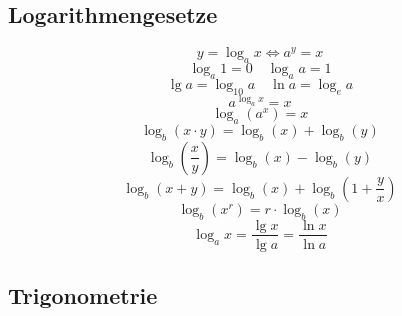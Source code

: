 \subsection{Logarithmengesetze}
\[ \boxed{y=\log_ax \Leftrightarrow a^y=x} \]
\[ \boxed{\log_a1=0 \quad \log_aa=1} \]
\[ \boxed{\lg a=\log_{10}a \quad \ln a = \log_ea} \]
\[ \boxed{a^{\log_ax}=x} \]
\[ \boxed{\log_a\left(a^x\right)=x} \]
\[ \boxed{\log_b\left(x \cdot y\right) = \log_b\left(x\right) + \log_b\left(y\right)} \]
\[ \boxed{\log_b \left( \frac{x}{y} \right) = \log_b\left(x\right) - \log_b\left(y\right)} \]
\[ \boxed{\log_b\left(x + y\right) = \log_b\left(x\right) + \log_b\left(1 + \frac{y}{x}\right)} \]
\[ \boxed{\log_b\left(x^r\right) = r \cdot \log_b\left(x\right)} \]
\[ \boxed{\log_ax=\frac{\lg x}{\lg a}=\frac{\ln x}{\ln a}} \]

\newpage
\subsection{Trigonometrie}

